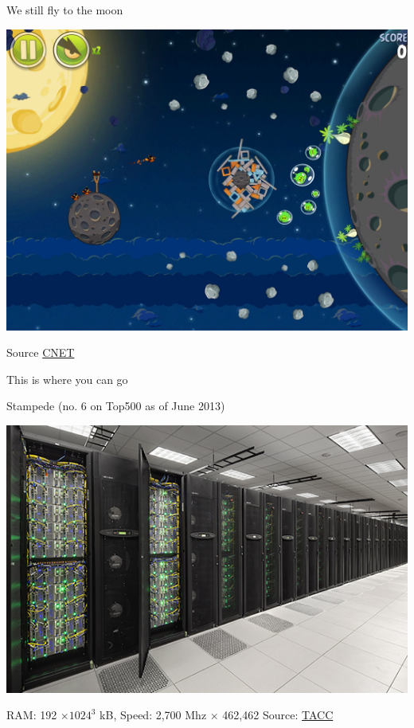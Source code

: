 \documentclass[xcolor=table,compress]{beamer}
\begin{document}
\begin{frame}{We still fly to the moon}
\begin{center}
\includegraphics[height=0.7\textheight]{./Angry_Birds_Space_HD}
\end{center}
\tiny Source \href{http://i.i.cbsi.com/cnwk.1d/i/tim/2012/03/22/Angry_Birds_Space_HD.jpg}{CNET}
\end{frame}

\begin{frame}{This is where you can go}
\begin{block}{Stampede (no. 6 on Top500 as of June 2013)}
\begin{center}
\includegraphics[height=0.5\textheight]{./stampede}
\end{center}\pause
RAM: 192 $\times 1024^3$ kB, Speed: 2,700 Mhz $\times$ {\Large 462,462}\newline
\tiny Source: \href{http://www.tacc.utexas.edu/image/image_gallery?img_id=714317&t=1362676291566}{TACC}
\end{block}
\end{frame}
\end{document}

